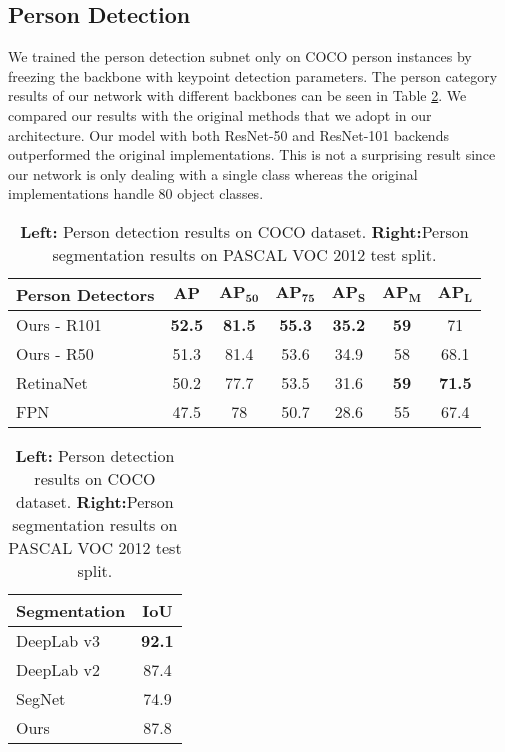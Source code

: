 \documentclass[runningheads]{llncs}
\begin{document}
\subsection{Person Detection}
We trained the person detection subnet only on COCO person instances by freezing the backbone with keypoint detection parameters. The person category results of our network with different backbones can be seen in Table \ref{table:person}. We compared our results with the original methods that we adopt in our architecture. Our model with both ResNet-50 and ResNet-101 backends outperformed the original implementations. This is not a surprising result since our network is only dealing with a single class whereas the original implementations handle $80$ object classes. 




\begin{table}[h]
\begin{center}
\caption{\textbf{Left:} Person detection results on COCO dataset. \textbf{Right:}Person segmentation results on PASCAL VOC 2012 test split.}
\label{table:person}
\begin{tabular}{l||cccccc}
\hline
\textbf{Person Detectors} & $\mathbf{AP}$ & $\mathbf{AP_{50}}$ & $\mathbf{AP_{75}}$ & $\mathbf{AP_{S}}$ & $\mathbf{AP_{M}}$ & $\mathbf{AP_{L}}$ \\ \hline
Ours - R101 & \textbf{52.5} & \textbf{81.5} & \textbf{55.3} & \textbf{35.2} & \textbf{59} & 71 \\
Ours - R50 & 51.3 & 81.4 & 53.6 & 34.9 & 58 & 68.1 \\
RetinaNet \cite{Lin2017} & 50.2 & 77.7 & 53.5 & 31.6 & \textbf{59} & \textbf{71.5} \\
FPN \cite{Lina} & 47.5 & 78 & 50.7 & 28.6 & 55 & 67.4 \\ \hline
\end{tabular}
\quad
\begin{tabular}{l||c}
\hline
\textbf{Segmentation} & \textbf{IoU} \\ \hline
DeepLab v3 \cite{Chen} & \textbf{92.1} \\ 
DeepLab v2 \cite{Chen2016} & 87.4 \\ 
SegNet \cite{kendall2015bayesian} & 74.9 \\ \hline
Ours & 87.8 \\ \hline
\end{tabular}
\end{center}
\end{table}
\end{document}
